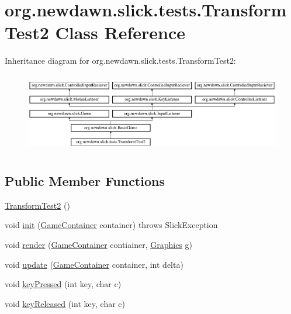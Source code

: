 \hypertarget{classorg_1_1newdawn_1_1slick_1_1tests_1_1_transform_test2}{}\section{org.\+newdawn.\+slick.\+tests.\+Transform\+Test2 Class Reference}
\label{classorg_1_1newdawn_1_1slick_1_1tests_1_1_transform_test2}
Inheritance diagram for org.\+newdawn.\+slick.\+tests.\+Transform\+Test2\+:\begin{figure}[H]
\begin{center}
\leavevmode
\includegraphics[height=3.522012cm]{classorg_1_1newdawn_1_1slick_1_1tests_1_1_transform_test2}
\end{center}
\end{figure}
\subsection*{Public Member Functions}
\begin{DoxyCompactItemize}
\item 
\mbox{\hyperlink{classorg_1_1newdawn_1_1slick_1_1tests_1_1_transform_test2_a091378469dfc8827b0230c8719785455}{Transform\+Test2}} ()
\item 
void \mbox{\hyperlink{classorg_1_1newdawn_1_1slick_1_1tests_1_1_transform_test2_a4b14a24691526c981ba222186b80b717}{init}} (\mbox{\hyperlink{classorg_1_1newdawn_1_1slick_1_1_game_container}{Game\+Container}} container)  throws Slick\+Exception 
\item 
void \mbox{\hyperlink{classorg_1_1newdawn_1_1slick_1_1tests_1_1_transform_test2_ad8cd70093a27c4115bf06bf2c9b82469}{render}} (\mbox{\hyperlink{classorg_1_1newdawn_1_1slick_1_1_game_container}{Game\+Container}} contiainer, \mbox{\hyperlink{classorg_1_1newdawn_1_1slick_1_1_graphics}{Graphics}} g)
\item 
void \mbox{\hyperlink{classorg_1_1newdawn_1_1slick_1_1tests_1_1_transform_test2_aaca9ebc1557a000fdb2289e625355864}{update}} (\mbox{\hyperlink{classorg_1_1newdawn_1_1slick_1_1_game_container}{Game\+Container}} container, int delta)
\item 
void \mbox{\hyperlink{classorg_1_1newdawn_1_1slick_1_1tests_1_1_transform_test2_a1ed06799be5189ef7c6fe102020de383}{key\+Pressed}} (int key, char c)
\item 
void \mbox{\hyperlink{classorg_1_1newdawn_1_1slick_1_1tests_1_1_transform_test2_a8355ed2fce9fa0841d9a5090204352c7}{key\+Released}} (int key, char c)
\end{DoxyCompactItemize}
